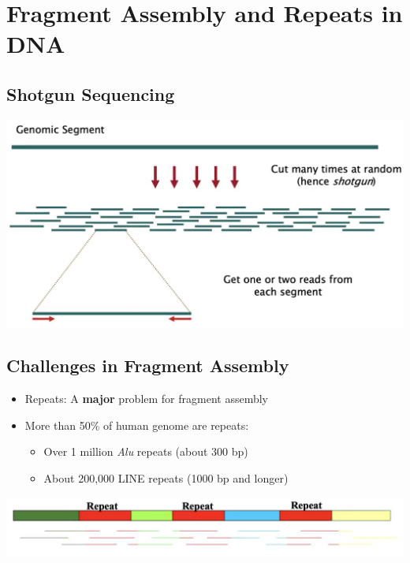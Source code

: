 \documentclass[10pt]{article}
\begin{document}
\section*{Fragment Assembly and Repeats in DNA}
\subsection*{Shotgun Sequencing}
\begin{center}
    \includegraphics*[width=\textwidth]{W4_13.png}
\end{center}

\subsection*{Challenges in Fragment Assembly}
\begin{itemize}
    \item Repeats: A \textbf{major} problem for fragment assembly
    \item More than 50\% of human genome are repeats:
    \begin{itemize}
        \item Over 1 million \textit{Alu} repeats (about 300 bp)
        \item About 200,000 LINE repeats (1000 bp and longer)
    \end{itemize}
\end{itemize}
\begin{center}
    \includegraphics*[width=\textwidth]{W4_14.png}
\end{center}
\end{document}
